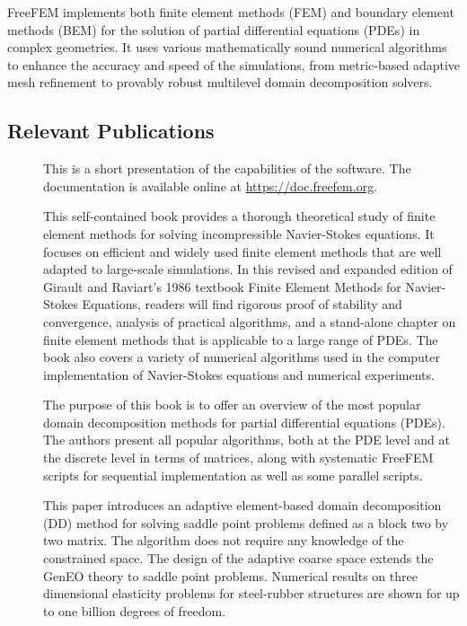 FreeFEM implements both finite element methods (FEM) and boundary element methods (BEM) for the solution of partial differential equations (PDEs) in complex geometries. It uses various mathematically sound numerical algorithms to enhance the accuracy and speed of the simulations, from metric-based adaptive mesh refinement to provably robust multilevel domain decomposition solvers.


\subsection{Relevant Publications}
\label{sec:Freefem++:publications}

\begin{description}
\item[] This is a short presentation of the capabilities of the software. The documentation is available online at \url{https://doc.freefem.org}.

\item[] This self-contained book provides a thorough theoretical study of finite element methods for solving incompressible Navier-Stokes equations. It focuses on efficient and widely used finite element methods that are well adapted to large-scale simulations. In this revised and expanded edition of Girault and Raviart's 1986 textbook Finite Element Methods for Navier-Stokes Equations, readers will find rigorous proof of stability and convergence, analysis of practical algorithms, and a stand-alone chapter on finite element methods that is applicable to a large range of PDEs. The book also covers a variety of numerical algorithms used in the computer implementation of Navier-Stokes equations and numerical experiments.

\item[] The purpose of this book is to offer an overview of the most popular domain decomposition methods for partial differential equations (PDEs). The authors present all popular algorithms, both at the PDE level and at the discrete level in terms of matrices, along with systematic FreeFEM scripts for sequential implementation as well as some parallel scripts.

\item[] This paper introduces an adaptive element-based domain decomposition (DD) method for solving saddle point problems defined as a block two by two matrix. The algorithm does not require any knowledge of the constrained space. The design of the adaptive coarse space extends the GenEO theory to saddle point problems. Numerical results on three dimensional elasticity problems for steel-rubber structures are shown for up to one billion degrees of freedom.


\end{description}
